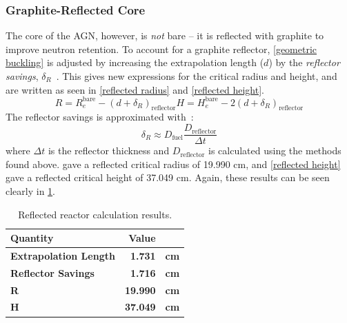 \documentclass{anstrans}
\begin{document}
    \subsubsection{Graphite-Reflected Core}
    The core of the AGN, however, is \textit{not} bare -- it is reflected with graphite to improve neutron retention.
    To account for a graphite reflector, \cref{geometric buckling} is adjusted by increasing the extrapolation length ($d$) by the \textit{reflector savings}, $\delta_R$~\cite{bowenHandCalculationMethods2023}.
    This gives new expressions for the critical radius and height, and are written as seen in \cref{reflected radius} and \cref{reflected height}.
    \begin{subequations}
        \begin{equation}
            \label{reflected radius}
            R = R_e^{\text{bare}}-(d+\delta_R)_{\text{reflector}}
        \end{equation}
        \begin{equation}
            \label{reflected height}
            H = H_e^{\text{bare}}-2(d+\delta_R)_{\text{reflector}}
        \end{equation}
    \end{subequations}
    The reflector savings is approximated with~\cite{bowenHandCalculationMethods2023}:
    \begin{equation}
        \label{reflector savings}
        \delta_R \approx D_{\text{fuel}}\frac{D_{\text{reflector}}}{\Delta t}
    \end{equation}
    where $\Delta t$ is the reflector thickness and $D_{\text{reflector}}$ is calculated using the methods found above.
     gave a reflected critical radius of 19.990 cm, and \cref{reflected height} gave a reflected critical height of 37.049 cm.
    Again, these results can be seen clearly in \cref{tab: reflected reactor}.
    \begin{table}
        \centering
        \begin{tabular}{lrl}
            \toprule
            \textbf{Quantity} & \textbf{Value} \\
            \midrule
            \textbf{Extrapolation Length} & \textbf{1.731}  & \textbf{cm} \\
            \textbf{Reflector Savings}    & \textbf{1.716}  & \textbf{cm} \\
            \textbf{R}                    & \textbf{19.990} & \textbf{cm} \\
            \textbf{H}                    & \textbf{37.049} & \textbf{cm} \\
            \bottomrule
        \end{tabular}
        \caption{Reflected reactor calculation results.}
        \label{tab: reflected reactor}
    \end{table}
\end{document}
